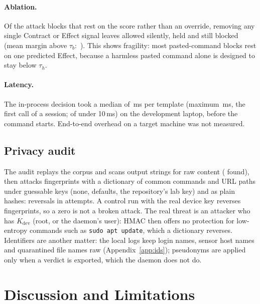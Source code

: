 \documentclass[10pt,twocolumn,letterpaper]{article}
\newcommand{\nats}{\,\text{nats}}
\begin{document}
\paragraph{Ablation.} Of the \LabScored{} attack blocks that rest on the score rather than an
override, removing any single Contract or Effect signal leaves \LabAblSilent{} allowed silently,
\LabAblHeld{} held and \LabAblStill{} still blocked (mean margin above $\tau_b$:
\LabMeanMargin\nats). This shows fragility: most pasted-command blocks rest on one predicted Effect,
because a harmless pasted command alone is designed to stay below $\tau_h$.

\paragraph{Latency.} The in-process decision took a median of \LabMedianMs{}\,ms per template
(maximum \LabMaxMs{}\,ms, the first call of a session; \LabUnderTenMs{} of \LabTemplates{} under
10\,ms) on the development laptop, before the command starts. End-to-end overhead on a target
machine was not measured.

\subsection{Privacy audit}
The audit replays the corpus and scans \AudStrings{} output strings for raw content
(\AudRawFindings{} found), then attacks \AudFingerprints{} fingerprints with a dictionary of
common commands and URL paths under guessable keys (none, defaults, the repository's lab key) and as
plain hashes: \AudReversals{} reversals in \AudAttempts{} attempts. A control run with the real
device key reverses \AudControl{} fingerprints, so a zero is not a broken attack. The real threat
is an attacker who has $K_{\text{dev}}$ (root, or the daemon's user): HMAC then offers no
protection for low-entropy commands such as \texttt{sudo apt update}, which a dictionary reverses.
Identifiers are another matter: the local logs keep login names, sensor host names and quarantined
file names raw (Appendix~\ref{app:ids}); pseudonyms are applied only when a verdict is exported,
which the daemon does not do.

\section{Discussion and Limitations}
\label{sec:discussion}
\end{document}
